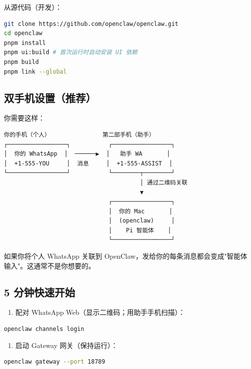 从源代码（开发）：

\begin{lstlisting}[language=bash]
git clone https://github.com/openclaw/openclaw.git
cd openclaw
pnpm install
pnpm ui:build # 首次运行时自动安装 UI 依赖
pnpm build
pnpm link --global
\end{lstlisting}


\subsection{双手机设置（推荐）}


你需要这样：

\begin{lstlisting}
你的手机（个人）               第二部手机（助手）
┌─────────────────┐           ┌─────────────────┐
│  你的 WhatsApp  │  ──────▶  │   助手 WA       │
│  +1-555-YOU     │  消息     │  +1-555-ASSIST  │
└─────────────────┘           └────────┬────────┘
                                       │ 通过二维码关联
                                       ▼
                              ┌─────────────────┐
                              │  你的 Mac       │
                              │  (openclaw)     │
                              │    Pi 智能体    │
                              └─────────────────┘
\end{lstlisting}


如果你将个人 WhatsApp 关联到 OpenClaw，发给你的每条消息都会变成"智能体输入"。这通常不是你想要的。

\subsection{5 分钟快速开始}


\begin{enumerate}
  \item 配对 WhatsApp Web（显示二维码；用助手手机扫描）：
\end{enumerate}


\begin{lstlisting}[language=bash]
openclaw channels login
\end{lstlisting}


\begin{enumerate}
  \item 启动 Gateway 网关（保持运行）：
\end{enumerate}


\begin{lstlisting}[language=bash]
openclaw gateway --port 18789
\end{lstlisting}


